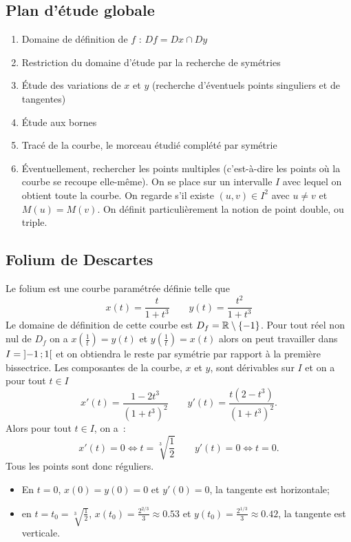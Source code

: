 \subsection{Plan d'étude globale}
\begin{enumerate}
  \item Domaine de définition de \(f\) : \(Df = Dx \cap Dy\)
  \item Restriction du domaine d'étude par la recherche de symétries
  \item Étude des variations de \(x\) et \(y\) (recherche d'éventuels points 
    singuliers et de tangentes)
  \item Étude aux bornes
  \item Tracé de la courbe, le morceau étudié complété par symétrie
  \item Éventuellement, rechercher les points multiples (c'est-à-dire les points 
    où la courbe se recoupe elle-même). On se place sur un intervalle \(I\) avec 
    lequel on obtient toute la courbe. On regarde s'il existe \((u, v) \in I^2\) 
    avec \(u \neq v\) et \(M(u)=M(v)\). On définit particulièrement la notion de 
    point double, ou triple.
\end{enumerate}

\subsection{Folium de Descartes}
Le folium est une courbe paramétrée définie telle que
\begin{equation}
  x(t) = \frac{t}{1 + t^3} \qquad y(t)=\frac{t^2}{1 + t^3}
\end{equation}
Le domaine de définition de cette courbe est \(D_f = \mathbb{R}\setminus\{-1\}\). Pour 
tout réel non nul de \(D_f\) on a \(x\left(\frac{1}{t}\right)=y(t)\) et 
\(y\left(\frac{1}{t}\right)=x(t)\) alors on peut travailler dans \(I = 
\left] -1 \, ;  1 \right[\) et on obtiendra le reste par symétrie par rapport à la 
première bissectrice. Les composantes de la courbe, \(x\) et \(y\), sont 
dérivables sur \(I\) et on a pour tout \(t \in I\)
\begin{equation}
  x'(t)=\dfrac{1-2t^3}{(1 + t^3)^2} \qquad y'(t)=\dfrac{t(2-t^3)}{(1 + t^3)^2}.
\end{equation}
Alors pour tout \(t \in I\), on a~:
\begin{equation}
  x'(t)=0 \iff t = \sqrt[3]{\frac{1}{2}} \qquad y'(t)=0 \iff t = 0.
\end{equation}
Tous les points sont donc réguliers.
\begin{itemize}
  \item En \(t = 0\), \(x(0)=y(0)=0\) et \(y'(0)=0\), la tangente est 
    horizontale;
  \item en \(t = t_0 = \sqrt[3]{\frac{1}{2}}\),  \(x(t_0)=\frac{2^{2/3}}{3} 
    \approx 0.53\) et \(y(t_0)=\frac{2^{1/3}}{3}\approx 0.42\), la tangente est 
    verticale.
\end{itemize}

